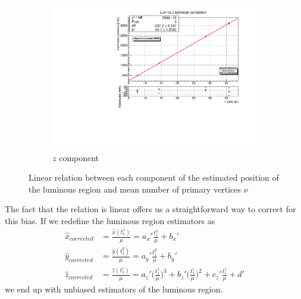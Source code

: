 \begin{figure}
    \begin{subfigure}{0.6\textwidth}
    \centering
    \includegraphics[width=\linewidth]{figures/z_to_lumi_fit_20000_numpix.pdf}
    \caption{$z$ component}
    \label{fig:z_to_lumi}
    \end{subfigure}
    \caption{Linear relation between each component of the estimated position of the luminous region and mean number of primary vertices $\nu$}
\end{figure}
The fact that the relation is linear offers us a straightforward way to correct for this bias. If we redefine the luminous region estimators as
\begin{equation}
\begin{split}
    \hat{x}_{corrected} &=\frac{\hat{x}(t^x_1)}{\mu}= a_x ' \frac{t^x_1}{\mu} + b_x '\\%
    \hat{y}_{corrected} &=\frac{\hat{y}(t^y_1)}{\mu}= a_y ' \frac{t^y_1}{\mu} + b_y ' \\%
    \hat{z}_{corrected} &=\frac{\hat{z}(t^z_1)}{\mu}=  a_z '\biggl(\frac{t^z_1}{\mu}\biggr)^3 + b_z '\biggl(\frac{t^z_1}{\mu}\biggr)^2 + c_z ' \frac{t^z_1}{\mu} + d ' \label{x_hat_corrected}
    \end{split}
    \end{equation}
we end up with unbiased estimators of the luminous region.




